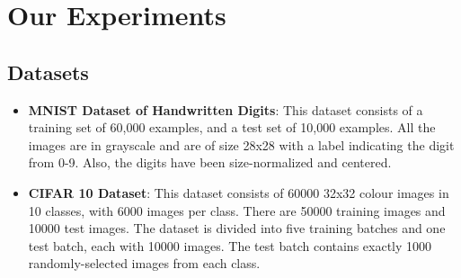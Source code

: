 \documentclass{article} %
\begin{document}
	
	
	
	\section{Our Experiments}
	\subsection{Datasets}
	\begin{itemize}
		\item \textbf{MNIST Dataset of Handwritten Digits}: \cite{lecun2010mnist} This dataset consists of a training set of 60,000 examples, and a test set of 10,000 examples. All the images are in grayscale and are of size 28x28 with a label indicating the digit from 0-9. Also, the digits have been size-normalized and centered.
		
		\item \textbf{CIFAR 10 Dataset}: \cite{Krizhevsky09learningmultiple} This dataset consists of 60000 32x32 colour images in 10 classes, with 6000 images per class. There are 50000 training images and 10000 test images. The dataset is divided into five training batches and one test batch, each with 10000 images. The test batch contains exactly 1000 randomly-selected images from each class.
	\end{itemize}
	
\end{document}
